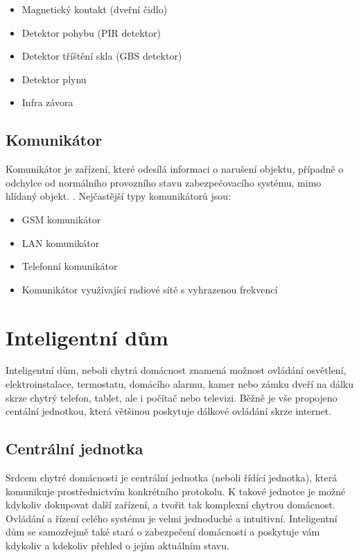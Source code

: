\documentclass[FM,DP]{tulthesis}  %
\begin{document}
\begin{itemize}
\item Magnetický kontakt (dveřní čidlo)
\item Detektor pohybu (PIR detektor)
\item Detektor tříštění skla (GBS detektor)
\item Detektor plynu
\item Infra závora
\end{itemize}

\subsection{Komunikátor}
Komunikátor je zařízení, které odesílá informaci o narušení objektu, případně o odchylce od normálního provozního stavu zabezpečovacího systému, mimo  hlídaný objekt. \cite{Electronic security signalisation}. Nejčastější typy komunikátorů jsou:

\begin{itemize}
\item GSM komunikátor
\item LAN komunikátor
\item Telefonní komunikátor
\item Komunikátor využívající radiové sítě s vyhrazenou frekvencí
\end{itemize}


\section{Inteligentní dům}
Inteligentní dům, neboli chytrá domácnost znamená možnost ovládání osvětlení, elektroinstalace, termostatu, domácího alarmu, kamer nebo zámku dveří na dálku skrze chytrý telefon, tablet, ale i počítač nebo televizi. Běžně je vše propojeno centální jednotkou, která většinou poskytuje dálkové ovládání skrze internet.

\subsection{Centrální jednotka}
Srdcem chytré domácnosti je centrální jednotka (neboli řídící jednotka), která komunikuje prostřednictvím konkrétního protokolu. K takové jednotce je možné kdykoliv dokupovat další zařízení, a tvořit tak komplexní chytrou domácnost. Ovládání a řízení celého systému je velmi jednoduché a intuitivní. Inteligentní dům se samozřejmě také stará o zabezpečení domácnosti a poskytuje vám kdykoliv a kdekoliv přehled o jejím aktuálním stavu.
\end{document}
